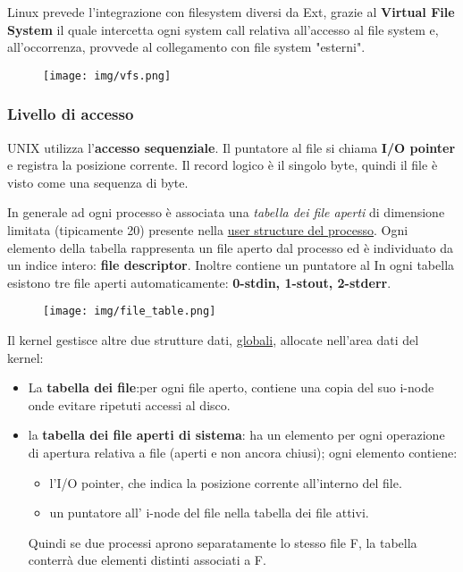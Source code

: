 \documentclass{article}
\begin{document}
\noindent Linux prevede l'integrazione con filesystem diversi
 da Ext, grazie al \textbf{Virtual File System} il quale
 intercetta ogni system call relativa all'accesso al file
system e, all'occorrenza, provvede al collegamento
con file system "esterni".

\begin{figure}[h!]
    \begin{center}
        \texttt{[image: img/vfs.png]}      
    \end{center}
\end{figure}

\subsubsection{Livello di accesso}
UNIX utilizza l'\textbf{accesso sequenziale}. Il puntatore 
al file si chiama \textbf{I/O pointer} e registra la posizione
corrente. Il record logico è il singolo byte, quindi il file è
visto come una sequenza di byte.

\noindent In generale ad ogni processo è associata una \textit{tabella dei file 
aperti} di dimensione limitata (tipicamente 20) presente
nella \underline{user structure del processo}.
Ogni elemento della tabella rappresenta
un file aperto dal processo ed è individuato da un 
indice intero: \textbf{file descriptor}. Inoltre contiene un 
puntatore al
In ogni tabella esistono tre file aperti automaticamente:
\textbf{0-stdin, 1-stout, 2-stderr}.

\begin{figure}[h!]
    \begin{center}
        \texttt{[image: img/file\_table.png]}      
    \end{center}
\end{figure}

\noindent Il kernel gestisce altre due strutture dati,
\underline{globali}, allocate nell'area dati del kernel:
\begin{itemize}
    \item La \textbf{tabella dei file}:per ogni file aperto, contiene una
    copia del suo i-node onde evitare ripetuti accessi al disco.
    \item la \textbf{tabella dei file aperti di sistema}:
    ha un elemento per ogni operazione di apertura relativa a file 
    (aperti e non ancora chiusi); ogni elemento contiene:
        \begin{itemize}
            \item l'I/O pointer, che indica la posizione corrente 
            all'interno del file.
            \item un puntatore all' i-node del file nella tabella
             dei file attivi.
        \end{itemize}
    \noindent Quindi se due processi aprono separatamente lo
     stesso file  F, la tabella conterrà due elementi distinti
     associati a F.
\end{itemize}
\end{document}
